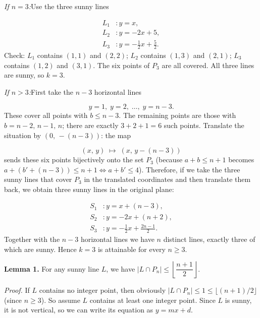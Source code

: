 \emph{If \(n = 3\):}Use the three sunny lines\par
\[
\begin{aligned}
L_1 &: y = x,\\
L_2 &: y = -2x + 5,\\
L_3 &: y = -\tfrac12 x + \tfrac52.
\end{aligned}
\]
Check: \(L_1\) contains \((1,1)\) and \((2,2)\); \(L_2\) contains \((1,3)\) and \((2,1)\); \(L_3\) contains \((1,2)\) and \((3,1)\). The six points of \(P_3\) are all covered. All three lines are sunny, so \(k = 3\).\par
\emph{If \(n > 3\):}First take the \(n-3\) horizontal lines\par
\[
y = 1,\; y = 2,\; \dots,\; y = n-3.
\]
These cover all points with \(b \le n-3\). The remaining points are those with \(b = n-2,\, n-1,\, n\); there are exactly \(3+2+1 = 6\) such points. Translate the situation by \((0,\,-(n-3))\): the map\par
\[
(x,\,y) \;\longmapsto\; (x,\,y-(n-3))
\]
sends these six points bijectively onto the set \(P_3\) (because \(a+b \le n+1\) becomes \(a + (b'+(n-3)) \le n+1 \iff a+b' \le 4\)). Therefore, if we take the three sunny lines that cover \(P_3\) in the translated coordinates and then translate them back, we obtain three sunny lines in the original plane:\par
\[
\begin{aligned}
S_1 &: y = x + (n-3),\\
S_2 &: y = -2x + (n+2),\\
S_3 &: y = -\tfrac12 x + \tfrac{2n-1}{2}.
\end{aligned}
\]
Together with the \(n-3\) horizontal lines we have \(n\) distinct lines, exactly three of which are sunny. Hence \(k = 3\) is attainable for every \(n\ge 3\).\par
\smallskip
{}
\textbf{Lemma 1.} For any sunny line \(L\), we have \(|L \cap P_n| \le \left\lfloor\dfrac{n+1}{2}\right\rfloor\).\par
\emph{Proof.} If \(L\) contains no integer point, then obviously \(|L\cap P_n|\le 1\le\lfloor(n+1)/2\rfloor\) (since \(n\ge 3\)). So assume \(L\) contains at least one integer point. Since \(L\) is sunny, it is not vertical, so we can write its equation as \(y = mx + d\).\par
{}
